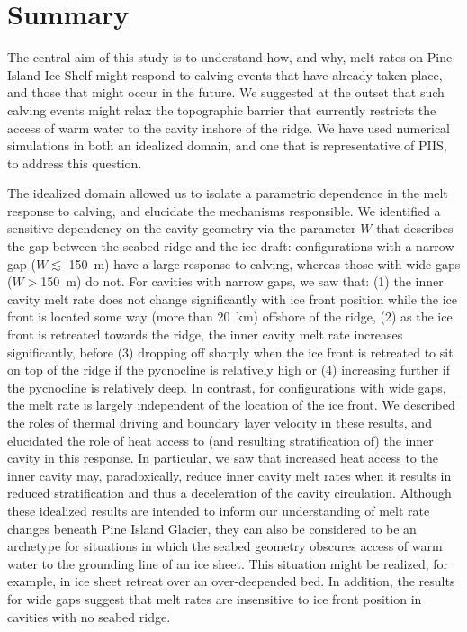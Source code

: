 \documentclass[draft]{agujournal2019}
\begin{document}
\section{Summary}\label{S:Summary}
The central aim of this study is to understand how, and why, melt rates on Pine Island Ice Shelf might respond to calving events that have already taken place, and those that might occur in the future. We suggested at the outset that such calving events might relax the topographic barrier that currently restricts the access of warm water to the cavity inshore of the ridge. We have used numerical simulations in both an idealized domain, and one that is representative of PIIS, to address this question.

The idealized domain allowed us to isolate a parametric dependence in the melt response to calving, and elucidate the mechanisms responsible. We identified a sensitive dependency on the cavity geometry via the parameter $W$ that describes the gap between the seabed ridge and the ice draft: configurations with a narrow gap ($W \lesssim$ 150~m) have a large response to calving, whereas those with wide gaps ($W>$150~m) do not. For cavities with narrow gaps, we saw that: (1) the inner cavity melt rate does not change significantly with ice front position while the ice front is located some way (more than 20~km) offshore of the ridge, (2) as the ice front is retreated towards the ridge, the inner cavity melt rate increases significantly, before (3) dropping off sharply when the ice front is retreated to sit on top of the ridge if the pycnocline is relatively high or (4) increasing further if the pycnocline is relatively deep. In contrast, for configurations with wide gaps, the melt rate is largely independent of the location of the ice front. We described the roles of thermal driving and boundary layer velocity in these results, and elucidated the role of heat access to (and resulting stratification of) the inner cavity in this response. In particular, we saw that increased heat access to the inner cavity may, paradoxically, reduce inner cavity melt rates when it results in reduced stratification and thus a deceleration of the cavity circulation. Although these idealized results are intended to inform our understanding of melt rate changes beneath Pine Island Glacier, they can also be considered to be an archetype for situations in which the seabed geometry obscures access of warm water to the grounding line of an ice sheet. This situation might be realized, for example, in ice sheet retreat over an over-deepended bed. In addition, the results for wide gaps suggest that melt rates are insensitive to ice front position in cavities with no seabed ridge. 
\end{document}
